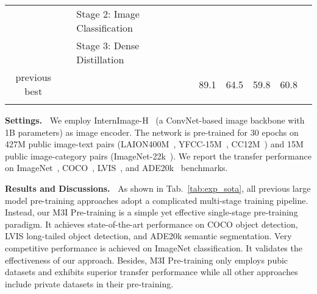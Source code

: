 \documentclass[10pt,twocolumn,letterpaper]{article}
\def\name{M3I Pre-training}
\newcommand{\RED}[1]{\textcolor{red}{{#1}}}
\begin{document}
\begin{table*}[t]
{\begin{tabular}{cllllccccc}
        & & Stage 2: Image Classification \\
        & & Stage 3: Dense Distillation \\
        \hline
        \multirow{2}{*}{previous best} & & & & & \multirow{2}{*}{89.1\RED{}} & \multirow{2}{*}{64.5\RED{}} & \multirow{2}{*}{59.8\RED{}} & \multirow{2}{*}{60.8\RED{}} \\
        \\
        \Xhline{2\arrayrulewidth}
        \end{tabular}
    }
    \vspace{-0.5em}
    \caption{Comparision of \name{} with existing large model pre-training methods for visual recognition. Top1 Accuracy, AP, AP, mIoU are reported on ImageNet validation set, COCO test-dev set, LVIS minival set (to avoid  data contamination following ~\cite{zhang2022glipv2}), and ADE20k validation set, respectively. We achieve state-of-the-art performance on object detection and semantic segmentation tasks. \name{} also demonstrate very competitive classification performance with only public datasets, while all other methods utilize large-scale private data (WIT-400M~\cite{radford2021learning} is used in ~\cite{wang2022image}, ImageNet-22k-ext~\cite{liu2022swin} is used in \cite{liu2022swin,wei2022contrastive}), which is strong correlated with the task of image classification. We also list previous best results on these tasks with only public training data for comparision. Results reference: \RED{}MOAT~\cite{yang2022moat}, \RED{}Group DETR v2~\cite{chen2022group}, \RED{}GLIPv2~\cite{zhang2022glipv2}, \RED{}Mask DINO~\cite{li2022mask}.} 
    \vspace{-1.0em}
    \label{tab:exp_sota}
\end{table*}
 
\vspace{0.5em}\noindent\textbf{Settings.~} We employ InternImage-H~\cite{anonymous2022internimg} (a ConvNet-based image backbone with 1B parameters) as image encoder. The network is pre-trained for 30 epochs on 427M public image-text pairs (LAION400M~\cite{schuhmann2021laion}, YFCC-15M~\cite{kalkowski2015real}, CC12M~\cite{changpinyo2021conceptual}) and 15M public image-category pairs (ImageNet-22k~\cite{deng2009imagenet}). We report the transfer performance on ImageNet~\cite{deng2009imagenet}, COCO~\cite{lin2014microsoft}, LVIS~\cite{gupta2019lvis}, and ADE20k~\cite{zhou2017scene} benchmarks.


\vspace{0.5em}\noindent\textbf{Results and Discussions.~} As shown in Tab.~\ref{tab:exp_sota}, all previous large model pre-training approaches adopt a complicated multi-stage training pipeline. Instead, our \name{} is a simple yet effective single-stage pre-training paradigm. It achieves state-of-the-art performance on COCO object detection, LVIS long-tailed object detection,  and ADE20k semantic segmentation. Very competitive performance is achieved on ImageNet classification. It validates the effectiveness of our approach. Besides, \name{} only employs pubic datasets and exhibits superior transfer performance while all other approaches include private datasets in their pre-training.
\end{document}
